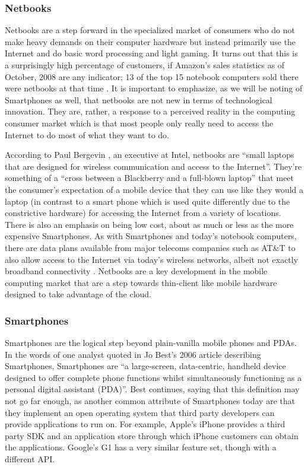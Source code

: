 \documentclass[12pt,oneside,letterpaper]{article}
\begin{document}
\subsubsection{Netbooks}

Netbooks are a step forward in the specialized market of consumers who do not
make heavy demands on their computer hardware but instead primarily use the
Internet and do basic word processing and light gaming.  It turns out that this
is a surprisingly high percentage of customers, if Amazon's sales statistics as
of October, 2008 are any indicator; 13 of the top 15 notebook computers sold
there were netbooks at that time \citep{copeland2008}.  It is important to
emphasize, as we will be noting of Smartphones as well, that netbooks are not
new in terms of technological innovation.  They are, rather, a response to a
perceived reality in the computing consumer market which is that most people
only really need to access the Internet to do most of what they want to do.

According to Paul Bergevin \citeyearpar{bergevin2008}, an executive at Intel,
netbooks are ``small laptops that are designed for wireless communication and
access to the Internet''.  They're something of a ``cross between a Blackberry
and a full-blown laptop'' \citep{copeland2008} that meet the consumer's
expectation of a mobile device that they can use like they would a laptop (in
contrast to a smart phone which is used quite differently due to the
constrictive hardware) for accessing the Internet from a variety of locations.
There is also an emphasis on being low cost, about as much or less as the more
expensive Smartphones.  As with Smartphones and today's notebook computers,
there are data plans available from major telecoms companies such as AT\&T to
also allow access to the Internet via today's wireless networks, albeit not
exactly broadband connectivity \citep{ap2009}.  Netbooks are a key development
in the mobile computing market that are a step towards thin-client like mobile
hardware designed to take advantage of the cloud.

\subsubsection{Smartphones}

Smartphones are the logical step beyond plain-vanilla mobile phones and PDAs.
In the words of one analyst quoted in Jo Best's 2006 article describing
Smartphones, Smartphones are ``a large-screen, data-centric, handheld device
designed to offer complete phone functions whilst simultaneously functioning as
a personal digital assistant (PDA)''.  Best continues, saying that this
definition may not go far enough, as another common attribute of Smartphones
today are that they implement an open operating system that third party
developers can provide applications to run on.  For example, Apple's iPhone
provides a third party SDK and an application store through which iPhone
customers can obtain the applications.  Google's G1 has a very similar feature
set, though with a different API.
\end{document}
